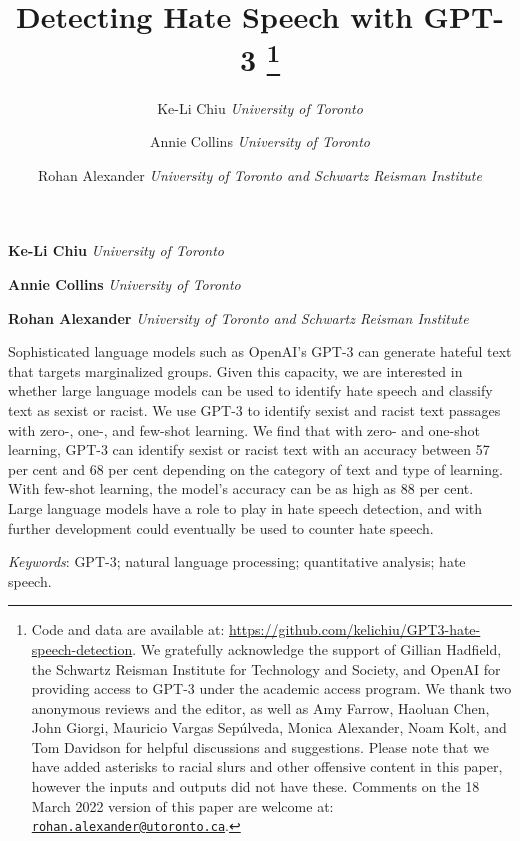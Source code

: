 \documentclass[12pt,]{article}
\title{Detecting Hate Speech with GPT-3 \thanks{Code and data are available at: \url{https://github.com/kelichiu/GPT3-hate-speech-detection}. We gratefully acknowledge the support of Gillian Hadfield, the Schwartz Reisman Institute for Technology and Society, and OpenAI for providing access to GPT-3 under the academic access program. We thank two anonymous reviews and the editor, as well as Amy Farrow, Haoluan Chen, John Giorgi, Mauricio Vargas Sepúlveda, Monica Alexander, Noam Kolt, and Tom Davidson for helpful discussions and suggestions. Please note that we have added asterisks to racial slurs and other offensive content in this paper, however the inputs and outputs did not have these. Comments on the 18 March 2022 version of this paper are welcome at: \href{mailto:rohan.alexander@utoronto.ca}{\nolinkurl{rohan.alexander@utoronto.ca}}.}  }
\author{\Large Ke-Li Chiu\vspace{0.05in} \newline\normalsize\emph{University of Toronto}   \and \Large Annie Collins\vspace{0.05in} \newline\normalsize\emph{University of Toronto}   \and \Large Rohan Alexander\vspace{0.05in} \newline\normalsize\emph{University of Toronto and Schwartz Reisman Institute}  }
\date{}
\newcommand*{\authorfont}{\fontfamily{phv}\selectfont}
\renewenvironment{abstract}
 {{%
    \setlength{\leftmargin}{0mm}
    \setlength{\rightmargin}{\leftmargin}%
  }%
  \relax}
 {\endlist}
\begin{document}
	
%    


{%
\setlength{\parindent}{0pt}
\thispagestyle{plain}
{\fontsize{18}{20}\selectfont\raggedright 
\maketitle  %

}

{
   \vskip 13.5pt\relax \normalsize\fontsize{11}{12} 
\textbf{\authorfont Ke-Li Chiu} \hskip 15pt \emph{\small University of Toronto}   \par \textbf{\authorfont Annie Collins} \hskip 15pt \emph{\small University of Toronto}   \par \textbf{\authorfont Rohan Alexander} \hskip 15pt \emph{\small University of Toronto and Schwartz Reisman Institute}   

}

}








\begin{abstract}

    \hbox{\vrule height .2pt width 39.14pc}

    \vskip 8.5pt %

\noindent Sophisticated language models such as OpenAI's GPT-3 can generate hateful text that targets marginalized groups. Given this capacity, we are interested in whether large language models can be used to identify hate speech and classify text as sexist or racist. We use GPT-3 to identify sexist and racist text passages with zero-, one-, and few-shot learning. We find that with zero- and one-shot learning, GPT-3 can identify sexist or racist text with an accuracy between 57 per cent and 68 per cent depending on the category of text and type of learning. With few-shot learning, the model's accuracy can be as high as 88 per cent. Large language models have a role to play in hate speech detection, and with further development could eventually be used to counter hate speech.


\vskip 8.5pt \noindent \emph{Keywords}: GPT-3; natural language processing; quantitative analysis; hate speech. \par

    \hbox{\vrule height .2pt width 39.14pc}



\end{abstract}
\end{document}
